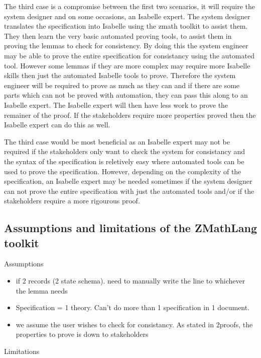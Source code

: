 The third case is a compromise between the first two scenarios, it will require the system designer and on some occasions, an Isabelle expert. The system designer translates the specification into Isabelle using the \gls{zmath} toolkit to assist them. They then learn the very basic automated proving tools, to assist them in proving the lemmas to check for consistency. By doing this the system engineer may be able to prove the entire specification for consistancy using the automated tool. However some lemmas if they are more complex may require more Isabelle skills then just the automated Isabelle tools to prove. Therefore the system engineer will be required to prove as much as they can and if there are some parts which can not be proved with automation, they can pass this along to an Isabelle expert. The Isabelle expert will then have less work to prove the remainer of the proof. If the stakeholders require more properties proved then the Isabelle expert can do this as well.

The third case would be most beneficial as an Isabelle expert may not be required if the stakeholders only want to check the system for consistancy and the syntax of the specification is reletively easy where automated tools can be used to prove the specification. However, depending on the complexity of the specification, an Isabelle expert may be needed sometimes if the system designer can not prove the entire specification with just the automated tools and/or if the stakeholders require a more rigourous proof.

\subsection{Assumptions and limitations of the ZMathLang toolkit}
Assumptions

\begin{itemize}
\item if 2 records (2 state schema). need to manually write the line to whichever the lemma needs

\item Specification = 1 theory. Can't do more than 1 specification in 1 document.

\item we assume the user wishes to check for consistancy. As stated in 2proofs, the properties to prove is down to stakeholders

\end{itemize}

Limitations

